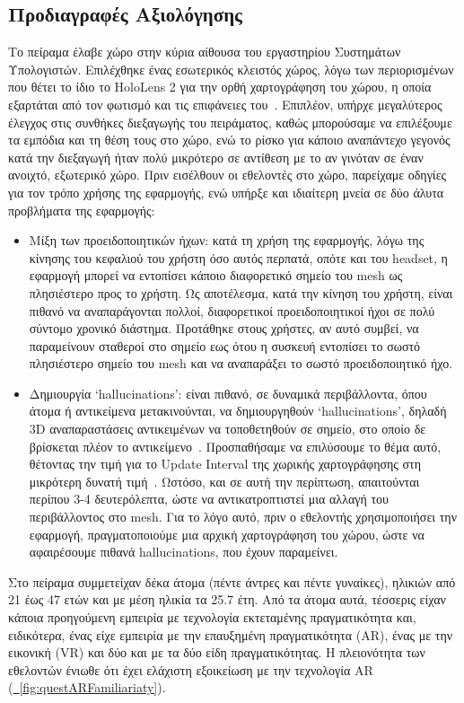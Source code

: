 \subsection{Προδιαγραφές Αξιολόγησης}
Το πείραμα έλαβε χώρο στην κύρια αίθουσα του εργαστηρίου Συστημάτων Υπολογιστών. Επιλέχθηκε ένας εσωτερικός κλειστός χώρος, λόγω των περιορισμένων που θέτει το ίδιο το HoloLens 2 για την ορθή χαρτογράφηση του χώρου, η οποία εξαρτάται από τον φωτισμό και τις επιφάνειες του~\cite{mattzmsft_2023_spatial}. Επιπλέον, υπήρχε μεγαλύτερος έλεγχος στις συνθήκες διεξαγωγής του πειράματος, καθώς μπορούσαμε να επιλέξουμε τα εμπόδια και τη θέση τους στο χώρο, ενώ το ρίσκο για κάποιο αναπάντεχο γεγονός κατά την διεξαγωγή ήταν πολύ μικρότερο σε αντίθεση με το αν γινόταν σε έναν ανοιχτό, εξωτερικό χώρο.
Πριν εισέλθουν οι εθελοντές στο χώρο, παρείχαμε οδηγίες για τον τρόπο χρήσης της εφαρμογής, ενώ υπήρξε και ιδιαίτερη μνεία σε δύο άλυτα προβλήματα της εφαρμογής:
\begin{itemize}
    \item Μίξη των προειδοποιητικών ήχων: κατά τη χρήση της εφαρμογής, λόγω της κίνησης του κεφαλιού του χρήστη όσο αυτός περπατά, οπότε και του headset, η εφαρμογή μπορεί να εντοπίσει κάποιο διαφορετικό σημείο του mesh ως πλησιέστερο προς το χρήστη. Ως αποτέλεσμα, κατά την κίνηση του χρήστη, είναι πιθανό να αναπαράγονται πολλοί, διαφορετικοί προειδοποιητικοί ήχοι σε πολύ σύντομο χρονικό διάστημα. Προτάθηκε στους χρήστες, αν αυτό συμβεί, να παραμείνουν σταθεροί στο σημείο εως ότου η συσκευή εντοπίσει το σωστό πλησιέστερο σημείο του mesh και να αναπαράξει το σωστό προειδοποιητικό ήχο.
    \item Δημιουργία `hallucinations': είναι πιθανό, σε δυναμικά περιβάλλοντα, όπου άτομα ή αντικείμενα μετακινούνται, να δημιουργηθούν `hallucinations', δηλαδή 3D αναπαραστάσεις αντικειμένων να τοποθετηθούν σε σημείο, στο οποίο δε βρίσκεται πλέον το αντικείμενο~\cite{mattzmsft_2023_spatial}. Προσπαθήσαμε να επιλύσουμε το θέμα αυτό, θέτοντας την τιμή για το Update Interval της χωρικής χαρτογράφησης στη μικρότερη δυνατή τιμή~\cite{davidklinems_2022_configuring}. Ωστόσο, και σε αυτή την περίπτωση, απαιτούνται περίπου 3-4 δευτερόλεπτα, ώστε να αντικατροπτιστεί μια αλλαγή του περιβάλλοντος στο mesh. Για το λόγο αυτό, πριν ο εθελοντής χρησιμοποιήσει την εφαρμογή, πραγματοποιούμε μια αρχική χαρτογράφηση του χώρου, ώστε να αφαιρέσουμε πιθανά hallucinations, που έχουν παραμείνει. %
\end{itemize}

Στο πείραμα συμμετείχαν δέκα άτομα (πέντε άντρες και πέντε γυναίκες), ηλικιών από 21 έως 47 ετών και με μέση ηλικία τα 25.7 έτη. Από τα άτομα αυτά, τέσσερις είχαν κάποια προηγούμενη εμπειρία με τεχνολογία εκτεταμένης πραγματικότητα και, ειδικότερα, ένας είχε εμπειρία με την επαυξημένη πραγματικότητα (AR), ένας με την εικονική (VR) και δύο και με τα δύο είδη πραγματικότητας. Η πλειονότητα των εθελοντών ένιωθε ότι έχει ελάχιστη εξοικείωση με την τεχνολογία AR (\hyperref[fig:questARFamiliariaty]{\schema~\ref*{fig:questARFamiliariaty}}).

